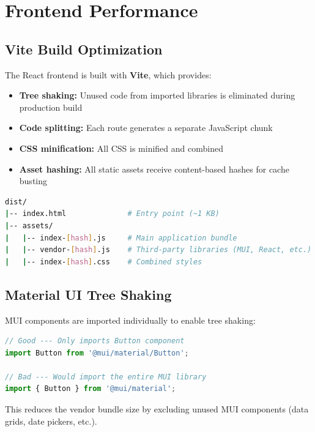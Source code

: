\section{Frontend Performance}
\label{sec:frontend-performance}

\subsection{Vite Build Optimization}

The React frontend is built with \textbf{Vite}, which provides:
\begin{itemize}
    \item \textbf{Tree shaking:} Unused code from imported libraries is eliminated during production build
    \item \textbf{Code splitting:} Each route generates a separate JavaScript chunk
    \item \textbf{CSS minification:} All CSS is minified and combined
    \item \textbf{Asset hashing:} All static assets receive content-based hashes for cache busting
\end{itemize}

\begin{lstlisting}[language=bash, caption=Production Build Output Structure]
dist/
|-- index.html              # Entry point (~1 KB)
|-- assets/
|   |-- index-[hash].js     # Main application bundle
|   |-- vendor-[hash].js    # Third-party libraries (MUI, React, etc.)
|   |-- index-[hash].css    # Combined styles
\end{lstlisting}

\subsection{Material UI Tree Shaking}

MUI components are imported individually to enable tree shaking:

\begin{lstlisting}[language=javascript, caption=MUI Import Patterns]
// Good --- Only imports Button component
import Button from '@mui/material/Button';

// Bad --- Would import the entire MUI library
import { Button } from '@mui/material';
\end{lstlisting}

This reduces the vendor bundle size by excluding unused MUI components (data grids, date pickers, etc.).

